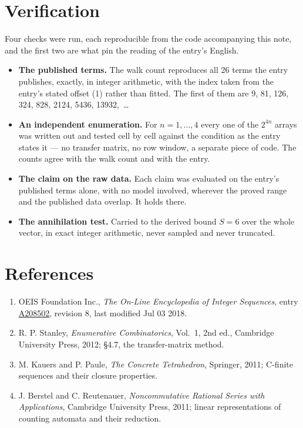 \documentclass[11pt]{article}
\theoremstyle{definition}
\begin{document}
\section{Verification}

Four checks were run, each reproducible from the code accompanying this note, and the first two are what pin the reading of the entry's English.

\begin{itemize}

\item {\bfseries The published terms.} The walk count reproduces all 26 terms the entry publishes, exactly, in integer arithmetic, with the index taken from the entry's stated offset (1) rather than fitted. The first of them are 9, 81, 126, 324, 828, 2124, 5436, 13932,~\dots

\item {\bfseries An independent enumeration.} For $n = 1,\dots,4$ every one of the $2^{4n}$ arrays was written out and tested cell by cell against the condition as the entry states it --- no transfer matrix, no row window, a separate piece of code. The counts agree with the walk count and with the entry.

\item {\bfseries The claim on the raw data.} Each claim was evaluated on the entry's published terms alone, with no model involved, wherever the proved range and the published data overlap. It holds there.

\item {\bfseries The annihilation test.} Carried to the derived bound $S = 6$ over the whole vector, in exact integer arithmetic, never sampled and never truncated.

\end{itemize}

\section{References}

\begin{enumerate}

\item OEIS Foundation Inc., \emph{The On-Line Encyclopedia of Integer Sequences}, entry \href{https://oeis.org/A208502}{A208502}, revision 8, last modified Jul 03 2018.

\item R. P. Stanley, \emph{Enumerative Combinatorics}, Vol.~1, 2nd ed., Cambridge University Press, 2012; \S4.7, the transfer-matrix method.

\item M. Kauers and P. Paule, \emph{The Concrete Tetrahedron}, Springer, 2011; C-finite sequences and their closure properties.

\item J. Berstel and C. Reutenauer, \emph{Noncommutative Rational Series with Applications}, Cambridge University Press, 2011; linear representations of counting automata and their reduction.

\end{enumerate}
\end{document}
